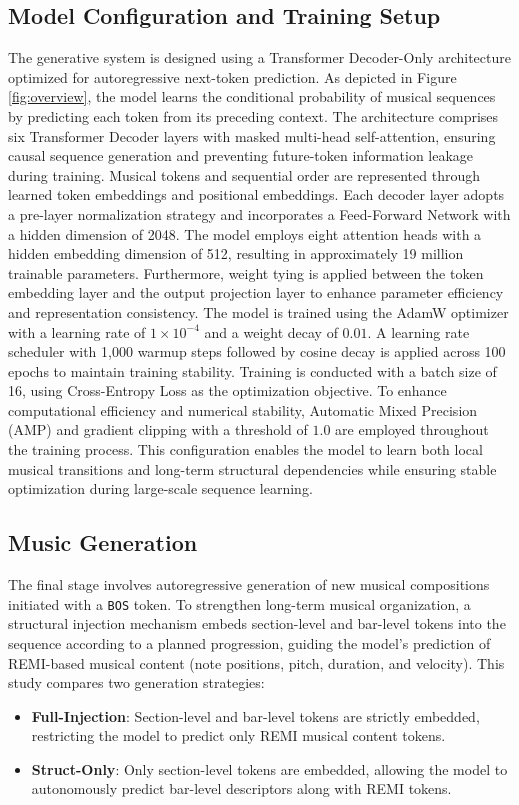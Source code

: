 \documentclass[conference,a4paper]{IEEEtran}
\begin{document}
\subsection{Model Configuration and Training Setup}
The generative system is designed using a Transformer Decoder-Only architecture optimized for autoregressive next-token prediction. As depicted in Figure \ref{fig:overview}, the model learns the conditional probability of musical sequences by predicting each token from its preceding context. The architecture comprises six Transformer Decoder layers with masked multi-head self-attention, ensuring causal sequence generation and preventing future-token information leakage during training. Musical tokens and sequential order are represented through learned token embeddings and positional embeddings. Each decoder layer adopts a pre-layer normalization strategy and incorporates a Feed-Forward Network with a hidden dimension of 2048. The model employs eight attention heads with a hidden embedding dimension of 512, resulting in approximately 19 million trainable parameters. Furthermore, weight tying is applied between the token embedding layer and the output projection layer to enhance parameter efficiency and representation consistency.
The model is trained using the AdamW optimizer with a learning rate of 
$1\times10^{-4}$ and a weight decay of $0.01$. A learning rate scheduler with 1{,}000 warmup steps followed by cosine decay is applied across 100 epochs to maintain training stability. Training is conducted with a batch size of 16, using Cross-Entropy Loss as the optimization objective. To enhance computational efficiency and numerical stability, Automatic Mixed Precision (AMP) and gradient clipping with a threshold of $1.0$ are employed throughout the training process. This configuration enables the model to learn both local musical transitions and long-term structural dependencies while ensuring stable optimization during large-scale sequence learning.

\subsection{Music Generation}
The final stage involves autoregressive generation of new musical compositions initiated with a \texttt{BOS} token. To strengthen long-term musical organization, a structural injection mechanism embeds section-level and bar-level tokens into the sequence according to a planned progression, guiding the model’s prediction of REMI-based musical content (note positions, pitch, duration, and velocity). This study compares two generation strategies:
\begin{itemize}
    \item \textbf{Full-Injection}: Section-level and bar-level tokens are strictly embedded, restricting the model to predict only REMI musical content tokens.
    \item \textbf{Struct-Only}: Only section-level tokens are embedded, allowing the model to autonomously predict bar-level descriptors along with REMI tokens.
\end{itemize}
\end{document}
